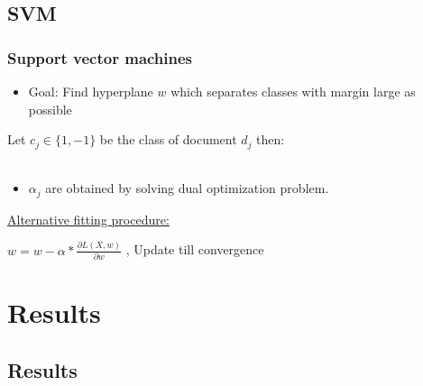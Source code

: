 \documentclass{beamer}
\begin{document}
\subsection{SVM}
\begin{frame}
	\frametitle{Support vector machines}
	\begin{itemize}
		\item Goal: Find hyperplane $w$ which separates classes with margin large as possible
	\end{itemize}

	\begin{Definition}
		Let $c_j \in \{1,-1\}$ be the class of document $d_j$ then: \\
		 \\
	\end{Definition}
	\begin{itemize}
		\item $\alpha_{j}$ are obtained by solving dual optimization problem.
	\end{itemize}
	\pause
	\underline{Alternative fitting procedure:}
	\\
	\begin{Definition}
		\centering
		$w = w - \alpha * \frac{\partial L(X,w)}{\partial w} $ , Update till convergence
	\end{Definition}

\end{frame}

\section{Results}
\subsection{Results}
\end{document}
